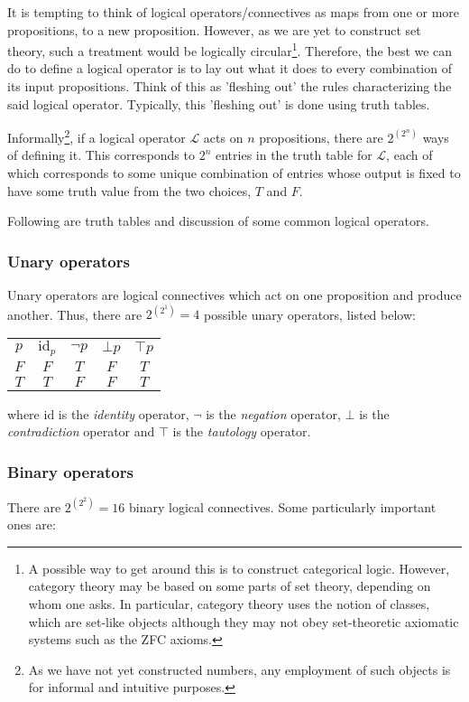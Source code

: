 \documentclass[12pt]{article}
\begin{document}
It is tempting to think of logical operators/connectives as maps from one or more propositions, to a new proposition. However, as we are yet to construct set theory, such a treatment would be logically circular\footnote{A possible way to get around this is to construct categorical logic. However, category theory may be based on some parts of set theory, depending on whom one asks. In particular, category theory uses the notion of classes, which are set-like objects although they may not obey set-theoretic axiomatic systems such as the ZFC axioms.}. Therefore, the best we can do to define a logical operator is to lay out what it does to every combination of its input propositions. Think of this as 'fleshing out' the rules characterizing the said logical operator. Typically, this 'fleshing out' is done using truth tables.

Informally\footnote{As we have not yet constructed numbers, any employment of such objects is for informal and intuitive purposes.}, if a logical operator $\mathcal{L}$ acts on $n$ propositions, there are $2^{\left( 2^n \right)}$ ways of defining it. This corresponds to $2^n$ entries in the truth table for $\mathcal{L}$, each of which corresponds to some unique combination of entries whose output is fixed to have some truth value from the two choices, $T$ and $F$.

Following are truth tables and discussion of some common logical operators.

\clearpage

\subsubsection{Unary operators}

Unary operators are logical connectives which act on one proposition and produce another. Thus, there are $2^{\left( 2^1 \right)} = 4$ possible unary operators, listed below:

\begin{center}
\begin{tabular}{|c||c|c|c|c|}
\hline 
$p$ & $\text{id}_p$ & $\lnot p$ & $\bot p$ & $\top p$ \\
\hhline{|=||=|=|=|=|}
$F$ & $F$ & $T$ & $F$ & $T$ \\
\hline
$T$ & $T$ & $F$ & $F$ & $T$ \\
\hline
\end{tabular}
\end{center}

where $\text{id}$ is the \emph{identity} operator, $\lnot$ is the \emph{negation} operator, $\bot$ is the \emph{contradiction} operator and $\top$ is the \emph{tautology} operator.

\subsubsection{Binary operators}

There are $2^{\left( 2^2 \right)} = 16$ binary logical connectives. Some particularly important ones are:
\end{document}
